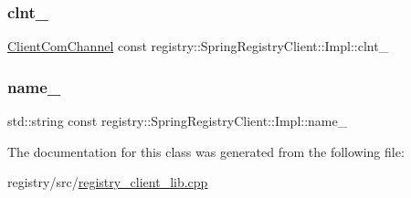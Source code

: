 \subsubsection{\texorpdfstring{clnt\+\_\+}{clnt\_}}
{\footnotesize\ttfamily \hyperlink{classregistry_1_1ClientComChannel}{Client\+Com\+Channel} const registry\+::\+Spring\+Registry\+Client\+::\+Impl\+::clnt\+\_\+\hspace{0.3cm}{\ttfamily [private]}}

\mbox{\label{classregistry_1_1SpringRegistryClient_1_1Impl_ad1c90e7182c68d7d48702d8b8329e805}} 
\subsubsection{\texorpdfstring{name\+\_\+}{name\_}}
{\footnotesize\ttfamily std\+::string const registry\+::\+Spring\+Registry\+Client\+::\+Impl\+::name\+\_\+\hspace{0.3cm}{\ttfamily [private]}}



The documentation for this class was generated from the following file\+:\begin{DoxyCompactItemize}
\item 
registry/src/\hyperlink{registry__client__lib_8cpp}{registry\+\_\+client\+\_\+lib.\+cpp}\end{DoxyCompactItemize}
